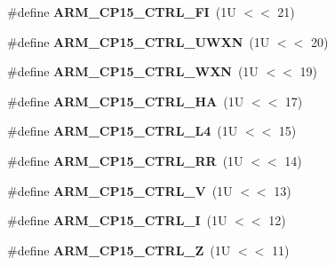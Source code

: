 \begin{DoxyCompactItemize}
\mbox{\label{group__RTEMSScoreCPUARMCP15_gabfd0c3ac83c9e2450d19fb41c78c41bf}} 
\#define {\bfseries A\+R\+M\+\_\+\+C\+P15\+\_\+\+C\+T\+R\+L\+\_\+\+FI}~(1\+U $<$$<$ 21)
\item 
\mbox{\label{group__RTEMSScoreCPUARMCP15_ga6638d3f77ccb40af2ecf42b00ddcf88b}} 
\#define {\bfseries A\+R\+M\+\_\+\+C\+P15\+\_\+\+C\+T\+R\+L\+\_\+\+U\+W\+XN}~(1\+U $<$$<$ 20)
\item 
\mbox{\label{group__RTEMSScoreCPUARMCP15_gae9b92896535e49793e6593be9695d490}} 
\#define {\bfseries A\+R\+M\+\_\+\+C\+P15\+\_\+\+C\+T\+R\+L\+\_\+\+W\+XN}~(1\+U $<$$<$ 19)
\item 
\mbox{\label{group__RTEMSScoreCPUARMCP15_gade358f23705f2cdea2fec6804372f89c}} 
\#define {\bfseries A\+R\+M\+\_\+\+C\+P15\+\_\+\+C\+T\+R\+L\+\_\+\+HA}~(1\+U $<$$<$ 17)
\item 
\mbox{\label{group__RTEMSScoreCPUARMCP15_ga5b691b99a22051cbc386a0a58503adf6}} 
\#define {\bfseries A\+R\+M\+\_\+\+C\+P15\+\_\+\+C\+T\+R\+L\+\_\+\+L4}~(1\+U $<$$<$ 15)
\item 
\mbox{\label{group__RTEMSScoreCPUARMCP15_gaa56e0b8a0f4b0f8327c6de851ec91dab}} 
\#define {\bfseries A\+R\+M\+\_\+\+C\+P15\+\_\+\+C\+T\+R\+L\+\_\+\+RR}~(1\+U $<$$<$ 14)
\item 
\mbox{\label{group__RTEMSScoreCPUARMCP15_gab8b34d416ab982e89613886eef8a2047}} 
\#define {\bfseries A\+R\+M\+\_\+\+C\+P15\+\_\+\+C\+T\+R\+L\+\_\+V}~(1\+U $<$$<$ 13)
\item 
\mbox{\label{group__RTEMSScoreCPUARMCP15_ga84d50377690811aad862941d3e81dc46}} 
\#define {\bfseries A\+R\+M\+\_\+\+C\+P15\+\_\+\+C\+T\+R\+L\+\_\+I}~(1\+U $<$$<$ 12)
\item 
\mbox{\label{group__RTEMSScoreCPUARMCP15_gab351f1205f823f89792bcb6638cb8345}} 
\#define {\bfseries A\+R\+M\+\_\+\+C\+P15\+\_\+\+C\+T\+R\+L\+\_\+Z}~(1\+U $<$$<$ 11)
\item 
$$
\end{DoxyCompactItemize}
